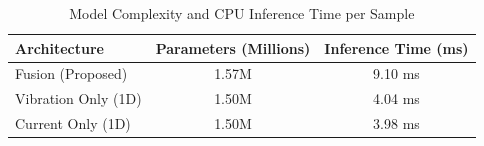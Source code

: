 \begin{table}[h]
\centering
\caption{Model Complexity and CPU Inference Time per Sample}
\label{tab:complexity}
\begin{tabular}{lcc}
\hline
\textbf{Architecture} & \textbf{Parameters (Millions)} & \textbf{Inference Time (ms)} \\
\hline
Fusion (Proposed) & 1.57M & 9.10 ms \\
Vibration Only (1D) & 1.50M & 4.04 ms \\
Current Only (1D) & 1.50M & 3.98 ms \\
\hline
\end{tabular}
\end{table}
